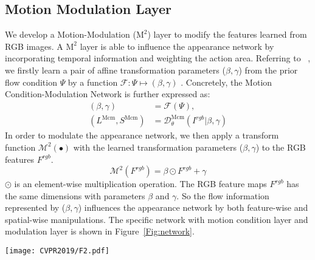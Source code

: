 \documentclass[10pt,twocolumn,letterpaper]{article}
\begin{document}
\subsection{Motion Modulation Layer}
We develop a Motion-Modulation ($\mathrm{M}^2$) layer to modify the features learned from RGB images. A $\mathrm{M}^2$ layer is able to influence the appearance network by incorporating temporal information and weighting the action area. Referring to ~\cite{Wang2018}, we firstly learn a pair of affine transformation parameters ($\beta, \gamma$) from the prior flow condition $\Psi$ by a function $\mathcal{F}: \Psi\longmapsto(\beta, \gamma)$ . Concretely, the Motion Condition-Modulation Network is further expressed as:
\begin{equation}
\begin{aligned}
(\beta, \gamma) &= \mathcal{F}(\Psi),\\
(L^{\mathrm{Mcm}}, S^{\mathrm{Mcm}}) &= \mathcal{D}^{\mathrm{Mcm}}_{\theta}(I^{rgb}|\beta, \gamma)   
\end{aligned}
\end{equation}
In order to modulate the appearance network, we then apply a transform function $\mathcal{M}^2(\bullet)$  with the learned transformation parameters ($\beta, \gamma$) to the RGB features $F^{rgb}$.
\begin{equation}
\mathcal{M}^2(F^{rgb}) = \beta\odot{F^{rgb}}+\gamma
\end{equation}
$\odot$ is an element-wise multiplication operation. The RGB feature maps $F^{rgb}$ has the same dimensions with parameters $\beta$ and $\gamma$. So the flow information represented by ($\beta, \gamma$) influences the appearance network by both feature-wise and spatial-wise manipulations. The specific network with motion condition layer and modulation layer is shown in Figure~\ref{Fig:network}.

\begin{figure*}[ht]
\centering
\texttt{[image: CVPR2019/F2.pdf]}
\caption{The structure of Motion Condition-Modulation Network based on SSD (Mcm-SSD). Motion Condition Layer maps flow images to prior condition information. The condition inputs to Motion Modulation Layer for generating transformation parameters which are used to modulate RGB features. Motion Modulation Layer is able to applied to any low-level convolutional features. }
\label{Fig:network}
\end{figure*}
\end{document}
